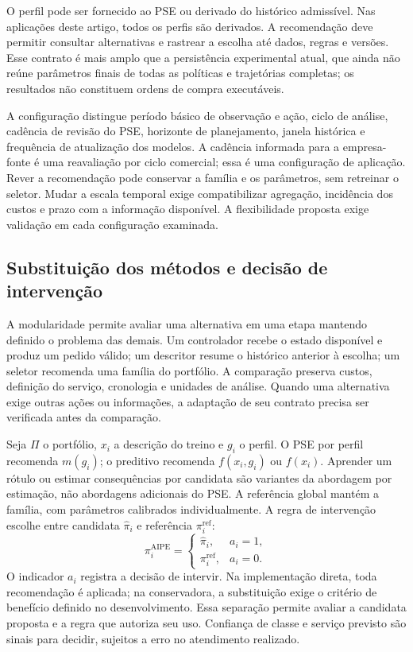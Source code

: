 \documentclass[preprint,12pt]{elsarticle}
\begin{document}
O perfil pode ser fornecido ao PSE ou derivado do histórico admissível. Nas aplicações deste artigo, todos os perfis são derivados. A recomendação deve permitir consultar alternativas e rastrear a escolha até dados, regras e versões. Esse contrato é mais amplo que a persistência experimental atual, que ainda não reúne parâmetros finais de todas as políticas e trajetórias completas; os resultados não constituem ordens de compra executáveis.

A configuração distingue período básico de observação e ação, ciclo de análise, cadência de revisão do PSE, horizonte de planejamento, janela histórica e frequência de atualização dos modelos. A cadência informada para a empresa-fonte é uma reavaliação por ciclo comercial; essa é uma configuração de aplicação. Rever a recomendação pode conservar a família e os parâmetros, sem retreinar o seletor. Mudar a escala temporal exige compatibilizar agregação, incidência dos custos e prazo com a informação disponível. A flexibilidade proposta exige validação em cada configuração examinada.

\subsection{Substituição dos métodos e decisão de intervenção}
A modularidade permite avaliar uma alternativa em uma etapa mantendo definido o problema das demais. Um controlador recebe o estado disponível e produz um pedido válido; um descritor resume o histórico anterior à escolha; um seletor recomenda uma família do portfólio. A comparação preserva custos, definição do serviço, cronologia e unidades de análise. Quando uma alternativa exige outras ações ou informações, a adaptação de seu contrato precisa ser verificada antes da comparação.

Seja $\Pi$ o portfólio, $x_i$ a descrição do treino e $g_i$ o perfil. O PSE por perfil recomenda $m(g_i)$; o preditivo recomenda $f(x_i,g_i)$ ou $f(x_i)$. Aprender um rótulo ou estimar consequências por candidata são variantes da abordagem por estimação, não abordagens adicionais do PSE. A referência global mantém a família, com parâmetros calibrados individualmente. A regra de intervenção escolhe entre candidata $\widehat\pi_i$ e referência $\pi_i^{\mathrm{ref}}$:
\[
 \pi_i^{\mathrm{AIPE}}=
 \begin{cases}\widehat\pi_i,&a_i=1,\\\pi_i^{\mathrm{ref}},&a_i=0.\end{cases}
\]
O indicador $a_i$ registra a decisão de intervir. Na implementação direta, toda recomendação é aplicada; na conservadora, a substituição exige o critério de benefício definido no desenvolvimento. Essa separação permite avaliar a candidata proposta e a regra que autoriza seu uso. Confiança de classe e serviço previsto são sinais para decidir, sujeitos a erro no atendimento realizado.
\end{document}
